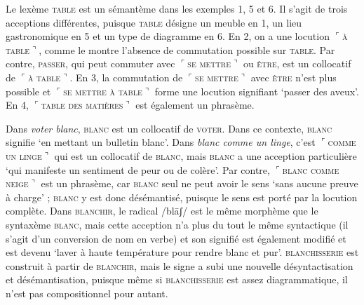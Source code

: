 {     Le lexème \textsc{table} est un sémantème dans les exemples 1, 5 et 6. Il s’agit de trois acceptions différentes, puisque \textsc{table} désigne un meuble en 1, un lieu gastronomique en 5 et un type de diagramme en 6. En 2, on a une locution \textrm{$⌜$}\textsc{à} \textsc{table}\textrm{$⌝$}, comme le montre l’absence de commutation possible sur \textsc{table}. Par contre, \textsc{passer}, qui peut commuter avec \textrm{$⌜$}\textsc{se} \textsc{mettre}\textrm{$⌝$} ou \textsc{être}, est un collocatif de \textrm{$⌜$}\textsc{à} \textsc{table}\textrm{$⌝$}. En 3, la commutation de \textrm{$⌜$}\textsc{se} \textsc{mettre}\textrm{$⌝$} avec \textsc{être} n’est plus possible et \textrm{$⌜$}\textsc{se} \textsc{mettre} \textsc{à} \textsc{table}\textrm{$⌝$} forme une locution signifiant ‘passer des aveux’. En 4, \textrm{$⌜$}\textsc{table} \textsc{des} \textsc{matières}\textrm{$⌝$} est également un phrasème.

     Dans \textit{voter blanc}, \textsc{blanc} est un collocatif de \textsc{voter}. Dans ce contexte, \textsc{blanc} signifie ‘en mettant un bulletin blanc’. Dans \textit{blanc comme un linge}, c’est \textrm{$⌜$}\textsc{comme} \textsc{un} \textsc{linge}\textrm{$⌝$} qui est un collocatif de \textsc{blanc}, mais \textsc{blanc} a une acception particulière ‘qui manifeste un sentiment de peur ou de colère’. Par contre, \textrm{$⌜$}\textsc{blanc} \textsc{comme} \textsc{neige}\textrm{$⌝$} est un phrasème, car \textsc{blanc} seul ne peut avoir le sens ‘sans aucune preuve à charge’ ; \textsc{blanc} y est donc désémantisé, puisque le sens est porté par la locution complète. Dans \textsc{blanchir,} le radical /blāʃ/ est le même morphème que le syntaxème \textsc{blanc}, mais cette acception n’a plus du tout le même syntactique (il s’agit d’un conversion de nom en verbe) et son signifié est également modifié et est devenu ‘laver à haute température pour rendre blanc et pur’. \textsc{blanchisserie} est construit à partir de \textsc{blanchir}, mais le signe a subi une nouvelle désyntactisation et désémantisation, puisque même si \textsc{blanchisserie} est assez diagrammatique, il n’est pas compositionnel pour autant.
}

